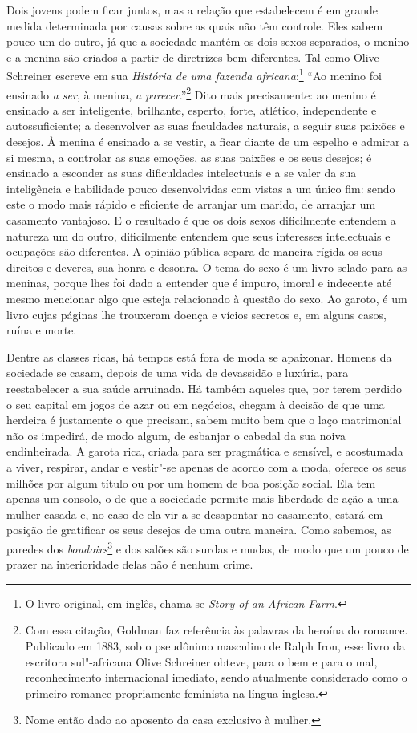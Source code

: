 Dois jovens podem ficar juntos, mas a relação que estabelecem é em
grande medida determinada por causas sobre as quais não têm controle.
Eles sabem pouco um do outro, já que a sociedade mantém os dois sexos
separados, o menino e a menina são criados a partir de diretrizes bem
diferentes. Tal como Olive Schreiner escreve em sua \textit{História de
uma fazenda africana}:\footnote{O livro original, em inglês, chama-se \textit{Story of an African Farm}.} ``Ao menino
foi ensinado \textit{a ser}, à menina, \textit{a parecer}.''\footnote{Com essa citação,
  Goldman faz referência às palavras da heroína do romance. Publicado em
  1883, sob o pseudônimo masculino de Ralph Iron, esse livro da
  escritora sul"-africana Olive Schreiner obteve, para o bem e para o
  mal, reconhecimento internacional imediato, sendo atualmente
  considerado como o primeiro romance propriamente feminista na língua
  inglesa.} Dito mais precisamente: ao menino é ensinado a ser
inteligente, brilhante, esperto, forte, atlético, independente e
autossuficiente; a desenvolver as suas faculdades naturais, a seguir
suas paixões e desejos. À menina é ensinado a se vestir, a ficar
diante de um espelho e admirar a si mesma, a controlar as suas emoções, as
suas paixões e os seus desejos; é ensinado a esconder as suas dificuldades
intelectuais e a se valer da sua inteligência e habilidade pouco desenvolvidas com vistas a um único fim: sendo este o modo mais rápido e eficiente de
arranjar um marido, de arranjar um casamento vantajoso. E o resultado é
que os dois sexos dificilmente entendem a natureza um do outro,
dificilmente entendem que seus interesses intelectuais e ocupações são
diferentes. A opinião pública separa de maneira rígida os seus direitos
e deveres, sua honra e desonra. O tema do sexo é um livro selado para as
meninas, porque lhes foi dado a entender que é impuro, imoral e
indecente até mesmo mencionar algo que esteja relacionado à questão do
sexo. Ao garoto, é um livro cujas páginas lhe trouxeram doença e vícios
secretos e, em alguns casos, ruína e morte.

Dentre as classes ricas, há tempos está fora de moda se apaixonar.
Homens da sociedade se casam, depois de uma vida de devassidão e luxúria,
para reestabelecer a sua saúde arruinada. Há também aqueles que, por terem
perdido o seu capital em jogos de azar ou em negócios, chegam à decisão
de que uma herdeira é justamente o que precisam, sabem muito bem que o
laço matrimonial não os impedirá, de modo algum, de esbanjar o cabedal
da sua noiva endinheirada. A garota rica, criada para ser pragmática e
sensível, e acostumada a viver, respirar, andar e vestir"-se apenas de
acordo com a moda, oferece os seus milhões por algum título ou por um
homem de boa posição social. Ela tem apenas um consolo, o de
que a sociedade permite mais liberdade de ação a uma mulher casada e, no
caso de ela vir a se desapontar no casamento, estará em posição de
gratificar os seus desejos de uma outra maneira. Como sabemos, as
paredes dos \textit{boudoirs}\footnote{Nome então dado ao aposento da casa
  exclusivo à mulher.} e dos salões são surdas e mudas, de modo que um
pouco de prazer na interioridade delas não é nenhum crime.

